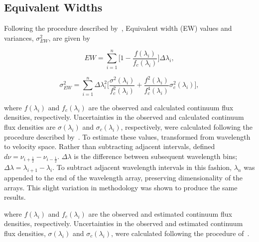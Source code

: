 \subsection{Equivalent Widths}

Following the procedure described by~\cite{Cushing_2005}, Equivalent width (EW) values and 
variances, $\sigma_{EW}^{2}$, are given by

\begin{equation}\label{eq:EW}
	EW = \sum_{i=1}^{n} \bigg[1 - \frac{f(\lambda_{i})}{f_{c}(\lambda_{i})} \bigg] \Delta\lambda_{i},
\end{equation}

\begin{equation}\label{eq:EWvar}
	\sigma_{EW}^{2} = \sum_{i=1}^{n} \Delta\lambda_{i}^{2} \bigg[ \frac{\sigma^{2}(\lambda_{i})}{f_{c}^{2}(\lambda_{i})} + \frac{f^{2}(\lambda_{i})}{f_{c}^{4}(\lambda_{i})}\sigma_{c}^{2}(\lambda_{i}) \bigg],
\end{equation}

\iffalse
	 where $f(\lambda_{i})$ and $f_{c}(\lambda_{i})$ are the observed 
	and calculated continuum flux densities, respectively.  Uncertainties in the 
	observed and calculated continuum flux densities are $\sigma(\lambda_{i})$ and 
	$\sigma_{c}(\lambda_{i})$, respectively, were calculated following the procedure 
	described by~\cite{Sembach_1992}.  To estimate these values, \cite{Sembach_1992} 
	transformed from wavelength to velocity space.  Rather than subtracting adjacent intervals, 
	\cite{Sembach_1992} defined $d\nu = \nu_{i+\frac{1}{2}} - \nu_{i-\frac{1}{2}}$.  
	$\Delta\lambda$ is the difference between subsequent wavelength bins; 
	$\Delta\lambda = \lambda_{i+1} - \lambda_{i}$.  To subtract adjacent 
	wavelength intervals in this fashion, $\lambda_{n}$ was appended to the 
	end of the wavelength array, preserving dimensionality of the arrays.  
	This slight variation in methodology was shown to produce the same results.

	 where $f(\lambda_{i})$ and $f_{c}(\lambda_{i})$ are the observed 
	and estimated continuum flux densities, respectively.  Uncertainties in the 
	observed and estimated continuum flux densities, $\sigma(\lambda_{i})$ and 
	$\sigma_{c}(\lambda_{i})$, were calculated following the procedure 
	of~\cite{Sembach_1992}.  

